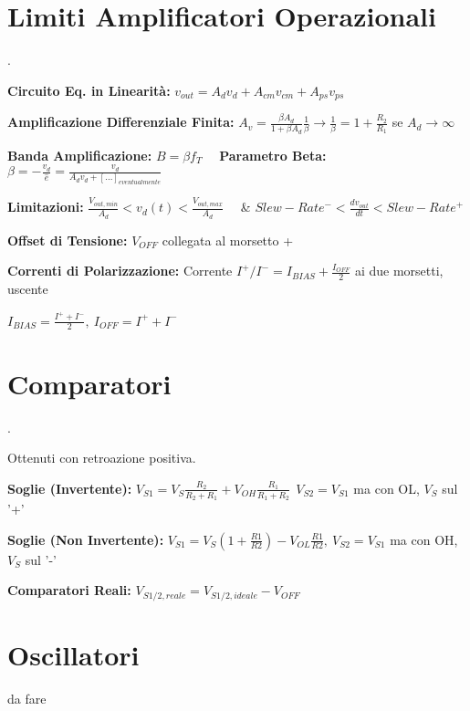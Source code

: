 \documentclass[12pt]{extarticle}
\begin{document}
\section{Limiti Amplificatori Operazionali}.

{\bf Circuito Eq. in Linearità:} $\displaystyle v_{out} = A_dv_d +A_{cm}v_{cm}+A_{ps}v_{ps}$

{\bf Amplificazione Differenziale Finita:} $\displaystyle A_v = \frac{\beta A_d}{1+\beta A_d}\frac{1}{\beta} \to \frac{1}{\beta} = 1+\frac{R_2}{R_1}$ se $A_d \to \infty$

{\bf Banda Amplificazione:} $\displaystyle B = \beta f_T$ \ \ {\bf Parametro Beta:} $\displaystyle \beta = -\frac{v_d}{\hat{e}} = \frac{v_d}{A_dv_d + [...]_{eventualmente}}$

{\bf Limitazioni:} $\displaystyle \frac{V_{out, min}}{A_d} < v_d(t) < \frac{V_{out, max}}{A_d}$ \ \ \&  $\displaystyle Slew-Rate^- < \frac{dv_{out}}{dt} < Slew-Rate^+$

{\bf Offset di Tensione:} $V_{OFF}$ collegata al morsetto +

{\bf Correnti di Polarizzazione:} Corrente $I^+/I^- = I_{BIAS}+\frac{I_{OFF}}{2}$ ai due morsetti, uscente

$\displaystyle I_{BIAS} = \frac{I^++I^-}{2}, \ I_{OFF} = I^++I^-$

\section{Comparatori}.

Ottenuti con retroazione positiva.

{\bf Soglie (Invertente):} $\displaystyle V_{S1} = V_S\frac{R_2}{R_2+R_1}+V_{OH}\frac{R_1}{R_1+R_2} \ \ V_{S2} = V_{S1} $ ma con OL, $V_S$ sul '+'

{\bf Soglie (Non Invertente):} $\displaystyle V_{S1} = V_S(1+\frac{R1}{R2}) - V_{OL}\frac{R1}{R2}, \ V_{S2} = V_{S1}$ ma con OH, $V_S$ sul '-'

{\bf Comparatori Reali:} $\displaystyle V_{S1/2, reale} = V_{S1/2, ideale}-V_{OFF}$

\section{Oscillatori}

da fare
\end{document}
